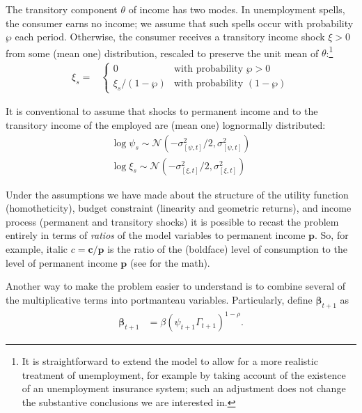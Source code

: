 \documentclass{article}
\newcommand{\CRRA}{\rho}
\newcommand{\cLvl}{\mathbf{c}}
\newcommand{\Rport}{\mathcal{R}}
\newcommand{\pLvl}{\mathbf{p}}
\newcommand{\DiscFac}{\beta}
\newcommand{\Ex}{\mathbb{E}}
\newcommand{\permGroFac}{\Gamma}
\newcommand{\permShk}{\psi}
\newcommand{\tranShk}{\theta}
\newcommand{\pZero}{\wp}
\newcommand{\tranShkEmp}{\xi}
\newcommand{\cNrm}{c}
\newcommand{\RNrm}{\mathcal{R}}
\begin{document}
The transitory component $\tranShk$ of income has two modes.
In unemployment spells, the consumer earns no income; we assume that such spells occur with probability $\pZero$ each period.
Otherwise, the consumer receives a transitory income shock $\xi > 0$ from some (mean one) distribution, rescaled to preserve the unit mean of $\tranShk$:\footnote{It is straightforward to extend the model to allow for a more realistic treatment of unemployment, for example by taking account of the existence of an unemployment insurance system; such an adjustment does not change the substantive conclusions we are interested in.}
\begin{align}
    \tranShkEmp_{s} = &
    \begin{cases}
        0\phantom{/\pZero} & \text{with probability $\pZero>0$}
        \\ \xi_{s}/(1-\pZero) & \text{with probability $(1-\pZero)$}
    \end{cases}
\end{align}

It is conventional to assume that shocks to permanent income and to the transitory income of the employed are (mean one) lognormally distributed:
\begin{align}
    \log \permShk_{s} \sim \mathcal{N}(-\sigma_{[\permShk, t]}^{2}/2,\sigma_{[\permShk, t]}^{2})
    \\ \log \xi_{s} \sim \mathcal{N}(-\sigma_{[\xi, t]}^{2}/2,\sigma_{[\xi, t]}^{2})
\end{align}


Under the assumptions we have made about the structure of the utility function (homotheticity), budget constraint (linearity and geometric returns), and income process (permanent and transitory shocks) it is possible to recast the problem entirely in terms of \textit{ratios} of the model variables to permanent income $\pLvl$.
So, for example, italic $\cNrm = \cLvl/\pLvl$ is the ratio of the (boldface) level of consumption to the level of permanent income $\pLvl$ (see \cite{BufferStockTheory} for the math).

Another way to make the problem easier to understand is to combine several of the multiplicative terms into portmanteau variables.
Particularly, define $\pmb{\DiscFac}_{t+1}$ as
\begin{align}
     \pmb{\DiscFac}_{t+1} & ={\beta} (\permShk_{t+1} \permGroFac_{t+1})^{1-\CRRA}.
\end{align}
\end{document}
